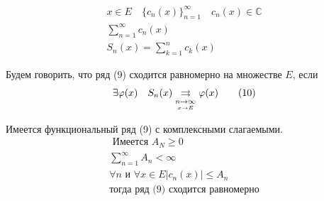 \documentclass[main]{subfiles}
\begin{document}
\begin{gather*}
    x \in E \quad \{c_n(x) \}^\infty_{n=1} \quad c_n(x) \in \mathbb{C} \\
    \sum^\infty_{n=1} c_n(x) \tag{9}\\
    S_n(x) = \sum^n_{k=1} c_k(x) 
\end{gather*}
\begin{definition}
    Будем говорить, что ряд (9) сходится равномерно на множестве $E$, если
    \begin{gather*}
        \exists \varphi(x) \quad S_n(x) \underset{\underset{x \to E}{n \to \infty}}{\rightrightarrows} \varphi(x) \tag{10}\\
    \end{gather*}
\end{definition}
\begin{theorem}
    Имеется функциональный ряд (9) с комплексными слагаемыми. 
    \begin{gather*}
        \text{ Имеется } A_N \geq 0 \\
        \sum^\infty_{n=1} A_n < \infty \tag{11}\\
        \forall n \text{ и } \forall x \in E |c_n(x)| \leq A_n \tag{12} \\
        \text{тогда ряд (9) сходится равномерно}
    \end{gather*}
\end{theorem}
\end{document}
